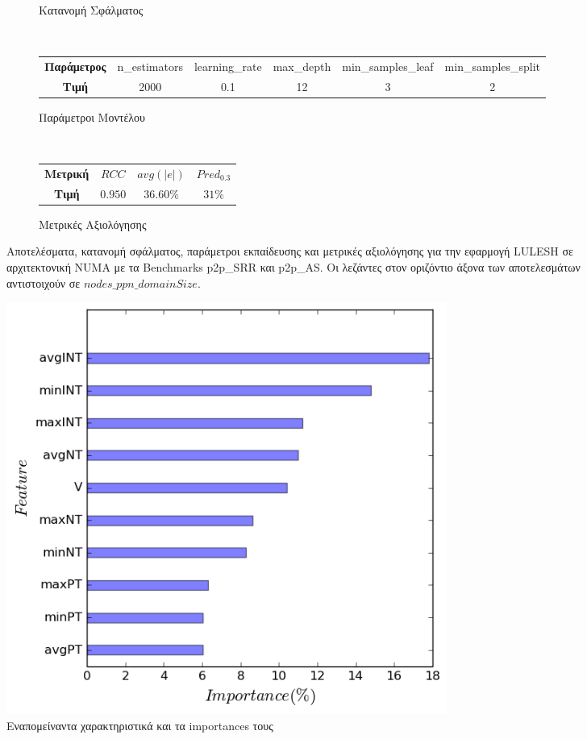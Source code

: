 \begin{figure}[ht]
\begin{subfigure}[b]{0.47\textwidth}
        \caption{Κατανομή Σφάλματος}
    \end{subfigure} 
    \\[0.2cm]
    \begin{subfigure}[b]{\textwidth}
   	 	\scriptsize
		\begin{tabular}{c||c|c|c|c|c}
			\textbf{Παράμετρος} & n\_estimators & learning\_rate & max\_depth & min\_samples\_leaf & min\_samples\_split \\
			\textbf{Τιμή}       &       2000        &  0.1               & 12          &  3                  &    2
		\end{tabular}
		\caption{Παράμετροι Μοντέλου}
    \end{subfigure}
    \\[0.2cm]
    \begin{subfigure}[b]{\textwidth}
    		\centering
   	 	\scriptsize
		\begin{tabular}{c||c|c|c}
			\textbf{Μετρική} & $RCC$ &   $avg(|e|)$ & $Pred_{0.3}$  \\
			\textbf{Τιμή}  &  $0.950$   &      $36.60\%
			$        &  $31\%$                                         
		\end{tabular}
		\caption{Μετρικές Αξιολόγησης}
    \end{subfigure}
    
        \caption{Αποτελέσματα, κατανομή σφάλματος, παράμετροι εκπαίδευσης και μετρικές αξιολόγησης για την εφαρμογή LULESH σε αρχιτεκτονική NUMA με τα Benchmarks p2p\_SRR και p2p\_AS. Οι λεζάντες στον οριζόντιο άξονα των αποτελεσμάτων αντιστοιχούν σε $nodes\_ppn\_domainSize$.}
    \label{fig:NB_cg_lulesh_NUMA}
\end{figure}

\begin{figure}[H]
    \centering
    \includegraphics[width=0.7\textwidth]{./images/importance_manually.png}
    \caption{Εναπομείναντα χαρακτηριστικά και τα importances τους}
    \label{fig:NB_cg_importances}
\end{figure}


